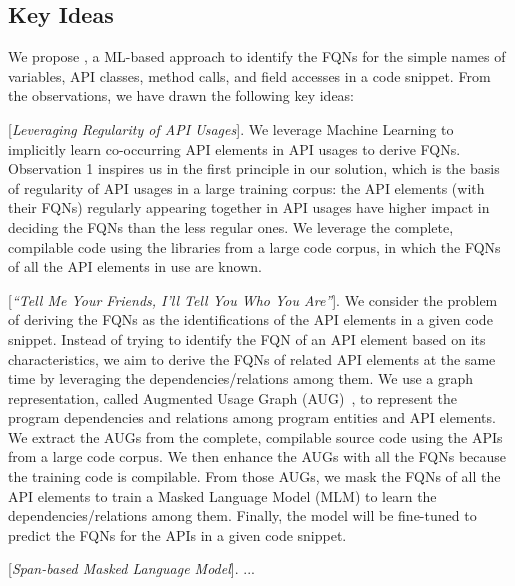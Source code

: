 \subsection{Key Ideas}
\label{sec:key}

We propose {\tool}, a ML-based approach to identify the FQNs for the
simple names of variables, API classes, method calls, and field
accesses in a code snippet. From the observations, we have drawn the
following key ideas:

\vspace{2pt}
 [{\em Leveraging Regularity of API
    Usages}].  We leverage Machine Learning to implicitly learn
co-occurring API elements in API usages to derive FQNs. Observation 1
inspires us in the first principle in our solution, which is the basis
of regularity of API usages in a large training corpus: the API
elements (with their FQNs) regularly appearing together in API usages
have higher impact in deciding the FQNs than the less regular ones. We
leverage the complete, compilable code using the libraries from a large
code corpus, in which the FQNs of all the API elements in use are
known.

\vspace{2pt}
 [{\em ``Tell Me Your Friends, I'll Tell You
    Who You Are''}]. We consider the problem of deriving the FQNs as
the identifications of the API elements in a given code snippet.
Instead of trying to identify the FQN of an API element based on its
characteristics, we aim to derive the FQNs of related API elements at
the same time by leveraging the dependencies/relations among them.  We
use a graph representation, called Augmented Usage Graph
(AUG)~\cite{msr19}, to represent the program dependencies and
relations among program entities and API elements. We extract the AUGs
from the complete, compilable source code using the APIs from a large
code corpus. We then enhance the AUGs with all the FQNs because the
training code is compilable. From those AUGs, we mask the FQNs of all
the API elements to train a Masked Language Model (MLM) to learn the
dependencies/relations among them. Finally, the model will be
fine-tuned to predict the FQNs for the APIs in a given code snippet.

\vspace{2pt}
 [{\em Span-based Masked Language Model}]. ...

